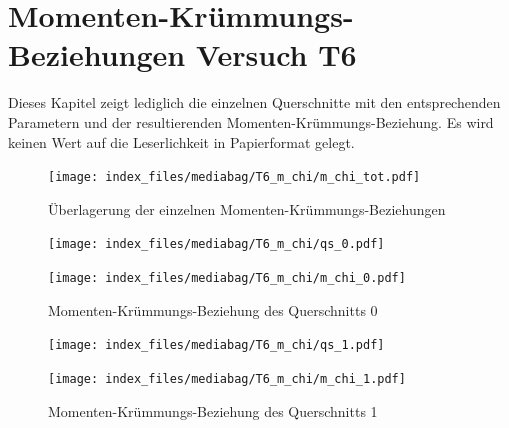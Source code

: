 \documentclass[
  11pt,
  letterpaper,
]{scrreprt}
\begin{document}
\chapter{Momenten-Krümmungs-Beziehungen Versuch
T6}\label{momenten-kruxfcmmungs-beziehungen-versuch-t6}


Dieses Kapitel zeigt lediglich die einzelnen Querschnitte mit den
entsprechenden Parametern und der resultierenden
Momenten-Krümmungs-Beziehung. Es wird keinen Wert auf die Leserlichkeit
in Papierformat gelegt.

\begin{figure}[H]

{\centering \texttt{[image: index\_files/mediabag/T6\_m\_chi/m\_chi\_tot.pdf]}

}

\caption{Überlagerung der einzelnen Momenten-Krümmungs-Beziehungen}

\end{figure}%

\begin{figure}[H]

\begin{minipage}{0.50\linewidth}
\texttt{[image: index\_files/mediabag/T6\_m\_chi/qs\_0.pdf]}\end{minipage}%
%
\begin{minipage}{0.50\linewidth}
\texttt{[image: index\_files/mediabag/T6\_m\_chi/m\_chi\_0.pdf]}\end{minipage}%

\caption{\label{fig-mchi_anhang}Momenten-Krümmungs-Beziehung des
Querschnitts 0}

\end{figure}%

\begin{figure}[H]

\begin{minipage}{0.50\linewidth}
\texttt{[image: index\_files/mediabag/T6\_m\_chi/qs\_1.pdf]}\end{minipage}%
%
\begin{minipage}{0.50\linewidth}
\texttt{[image: index\_files/mediabag/T6\_m\_chi/m\_chi\_1.pdf]}\end{minipage}%

\caption{\label{fig-mchi_anhang}Momenten-Krümmungs-Beziehung des
Querschnitts 1}

\end{figure}%
\end{document}
